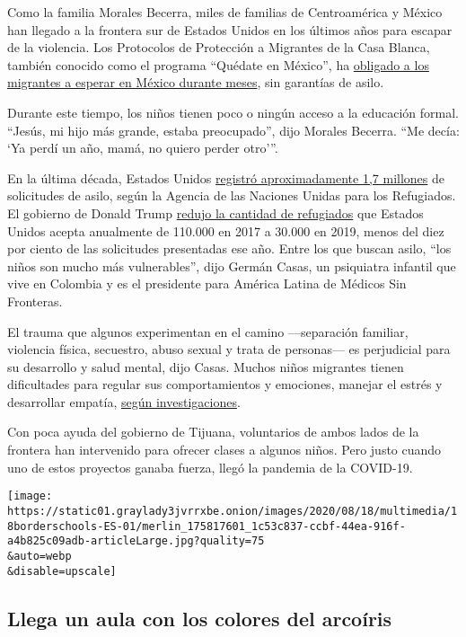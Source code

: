 Como la familia Morales Becerra, miles de familias de Centroamérica y
México han llegado a la frontera sur de Estados Unidos en los últimos
años para escapar de la violencia. Los Protocolos de Protección a
Migrantes de la Casa Blanca, también conocido como el programa ``Quédate
en México'', ha
\href{https://www.nytimes3xbfgragh.onion/interactive/2019/08/18/us/mexico-immigration-asylum.html}{obligado
a los migrantes a esperar en México durante meses}, sin garantías de
asilo.

Durante este tiempo, los niños tienen poco o ningún acceso a la
educación formal. ``Jesús, mi hijo más grande, estaba preocupado'', dijo
Morales Becerra. ``Me decía: `Ya perdí un año, mamá, no quiero perder
otro'''.

En la última década, Estados Unidos
\href{https://www.unhcr.org/globaltrends2019/}{registró aproximadamente
1,7 millones} de solicitudes de asilo, según la Agencia de las Naciones
Unidas para los Refugiados. El gobierno de Donald Trump
\href{https://www.migrationpolicy.org/article/refugees-and-asylees-united-states-2018}{redujo
la cantidad de refugiados} que Estados Unidos acepta anualmente de
110.000 en 2017 a 30.000 en 2019, menos del diez por ciento de las
solicitudes presentadas ese año. Entre los que buscan asilo, ``los niños
son mucho más vulnerables'', dijo Germán Casas, un psiquiatra infantil
que vive en Colombia y es el presidente para América Latina de Médicos
Sin Fronteras.

El trauma que algunos experimentan en el camino ---separación familiar,
violencia física, secuestro, abuso sexual y trata de personas--- es
perjudicial para su desarrollo y salud mental, dijo Casas. Muchos niños
migrantes tienen dificultades para regular sus comportamientos y
emociones, manejar el estrés y desarrollar empatía,
\href{https://onlinelibrary.wiley.com/doi/book/10.1002/9780470669280}{según
investigaciones}.

Con poca ayuda del gobierno de Tijuana, voluntarios de ambos lados de la
frontera han intervenido para ofrecer clases a algunos niños. Pero justo
cuando uno de estos proyectos ganaba fuerza, llegó la pandemia de la
COVID-19.

\texttt{[image: https://static01.graylady3jvrrxbe.onion/images/2020/08/18/multimedia/18borderschools-ES-01/merlin\_175817601\_1c53c837-ccbf-44ea-916f-a4b825c09adb-articleLarge.jpg?quality=75\\\&auto=webp\\\&disable=upscale]}

\hypertarget{llega-un-aula-con-los-colores-del-arcouxedris}{%
\subsection{Llega un aula con los colores del
arcoíris}\label{llega-un-aula-con-los-colores-del-arcouxedris}}

